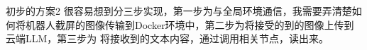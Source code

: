 \documentclass{beamer}
\begin{document}
    \begin{frame}{初步的方案2}
        很容易想到分三步实现，第一步为与全局环境通信，我需要弄清楚如何将机器人截屏的图像传输到Docker环境中，第二步为将接受的到的图像上传到云端LLM，第三步为
        将接收到的文本内容，通过调用相关节点，读出来。
    \end{frame}
\end{document}
